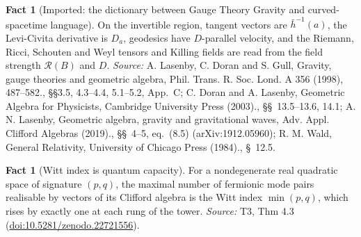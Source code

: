 \documentclass[11pt]{article}
\theoremstyle{definition}
\newtheorem{fact}[theorem]{Fact}
\theoremstyle{plain}
\providecommand{\hb}{}\renewcommand{\hb}{\bar{h}}
\begin{document}
\begin{fact}[Imported: the dictionary between Gauge Theory Gravity and curved-spacetime language]\label{c:synthesis.imported-gtg-dictionary}
On the invertible region, tangent vectors are $\hb^{-1}(a)$, the Levi-Civita derivative is $D_a$, geodesics have $D$-parallel velocity, and the Riemann, Ricci, Schouten and Weyl tensors and Killing fields are read from the field strength $\mathcal{R}(B)$ and $D$.
\emph{Source:} A. Lasenby, C. Doran and S. Gull, Gravity, gauge theories and geometric algebra, Phil. Trans. R. Soc. Lond. A 356 (1998), 487--582., \S\S 3.5, 4.3--4.4, 5.1--5.2, App.~C; C. Doran and A. Lasenby, Geometric Algebra for Physicists, Cambridge University Press (2003)., \S\S~13.5--13.6, 14.1; A. N. Lasenby, Geometric algebra, gravity and gravitational waves, Adv. Appl. Clifford Algebras (2019)., \S\S~4--5, eq.~(8.5) (arXiv:1912.05960); R. M. Wald, General Relativity, University of Chicago Press (1984)., \S~12.5.
\end{fact}

\begin{fact}[Witt index is quantum capacity]\label{c:tower.witt-index-quantum-capacity}
For a nondegenerate real quadratic space of signature $(p,q)$, the maximal number of fermionic mode pairs realisable by vectors of its Clifford algebra is the Witt index $\min(p,q)$, which rises by exactly one at each rung of the tower.
\emph{Source:} T3, Thm 4.3 (\href{https://doi.org/10.5281/zenodo.22721556}{doi:10.5281/zenodo.22721556}).
\end{fact}
\end{document}
